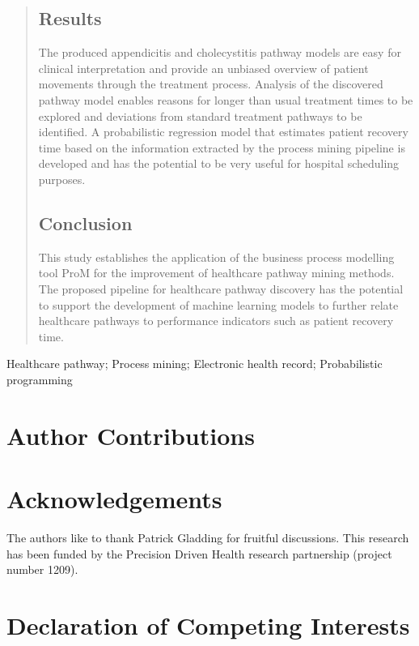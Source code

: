 \documentclass{elsarticle}
\begin{document}
\begin{frontmatter}
\begin{abstract}
\subsection*{Results}
The produced appendicitis and cholecystitis 
pathway models are
easy for clinical interpretation and provide an unbiased overview of patient movements through the treatment process. Analysis of the discovered pathway model enables reasons for longer than usual treatment times to be explored and deviations from standard treatment pathways to be identified. A probabilistic regression model that estimates patient recovery time based on the information extracted by the process mining pipeline is developed and has the potential to be very useful for hospital scheduling purposes.

\subsection*{Conclusion}
This study establishes the application of the business process modelling tool ProM for the improvement of healthcare pathway mining methods. 
The proposed pipeline for healthcare pathway discovery  has the potential to support the development of machine learning models to further relate healthcare pathways to performance indicators such as patient recovery time. 

\end{abstract}

\begin{keyword}
Healthcare pathway; Process mining; Electronic health record; Probabilistic programming
\end{keyword}

\end{frontmatter}

\linenumbers



\section*{Author Contributions}


\section*{Acknowledgements}
The authors like to thank Patrick Gladding for fruitful discussions.
This research has been funded by the Precision Driven Health research partnership (project number 1209).


\section*{Declaration of Competing Interests}



%
\end{document}
